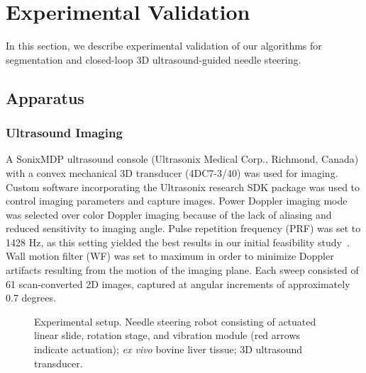 \section{Experimental Validation}
\label{sec:ExperimentalValidation}
In this section, we describe experimental validation of our algorithms for segmentation and closed-loop 3D ultrasound-guided needle steering.
\subsection{Apparatus}
\subsubsection{Ultrasound Imaging}
A SonixMDP ultrasound console (Ultrasonix Medical Corp., Richmond, Canada) with a convex mechanical 3D transducer (4DC7-3/40) was used for imaging. Custom software incorporating the Ultrasonix research SDK package was used to control imaging parameters and capture images. Power Doppler imaging mode was selected over color Doppler imaging because of the lack of aliasing and reduced sensitivity to imaging angle. Pulse repetition frequency (PRF) was set to 1428 Hz, as this setting yielded the best results in our initial feasibility study~\cite{Adebar2013}. Wall motion filter (WF) was set to maximum in order to minimize Doppler artifacts resulting from the motion of the imaging plane. Each sweep consisted of 61 scan-converted 2D images, captured at angular increments of approximately 0.7 degrees.

\begin{figure}[!t]
\caption[Experimental setup]{Experimental setup. Needle steering robot consisting of actuated linear slide, rotation stage, and vibration module (red arrows indicate actuation); \textit{ex vivo} bovine liver tissue; 3D ultrasound transducer.}
\label{fig:ExperimentalSetup}
\end{figure}

